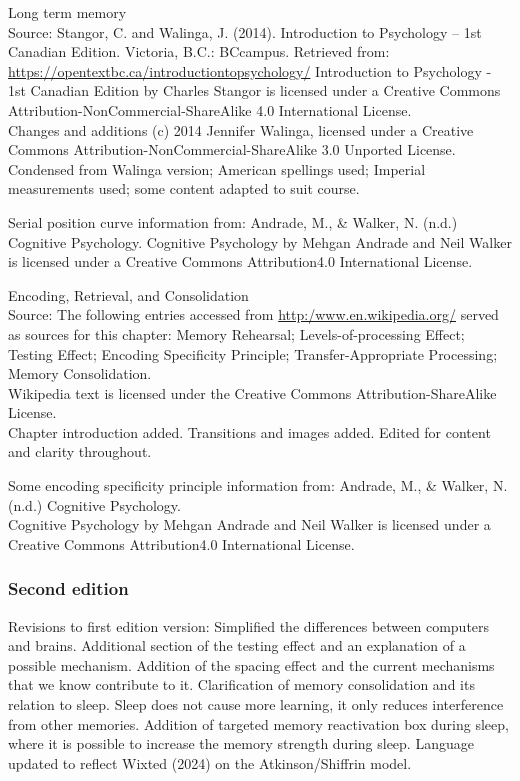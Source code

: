 \documentclass[
]{krantz}
\begin{document}
Long term memory\\
Source: Stangor, C. and Walinga, J. (2014). Introduction to Psychology -- 1st Canadian Edition. Victoria, B.C.: BCcampus. Retrieved from: \url{https://opentextbc.ca/introductiontopsychology/}
Introduction to Psychology - 1st Canadian Edition by Charles Stangor is licensed under a Creative Commons Attribution-NonCommercial-ShareAlike 4.0 International License.\\
Changes and additions (c) 2014 Jennifer Walinga, licensed under a Creative Commons Attribution-NonCommercial-ShareAlike 3.0 Unported License.\\
Condensed from Walinga version; American spellings used; Imperial measurements used; some content adapted to suit course.

Serial position curve information from: Andrade, M., \& Walker, N. (n.d.) Cognitive Psychology.
Cognitive Psychology by Mehgan Andrade and Neil Walker is licensed under a Creative Commons Attribution4.0 International License.

Encoding, Retrieval, and Consolidation\\
Source: The following entries accessed from \url{http:/www.en.wikipedia.org/} served as sources for this chapter: Memory Rehearsal; Levels-of-processing Effect; Testing Effect; Encoding Specificity Principle; Transfer-Appropriate Processing; Memory Consolidation.\\
Wikipedia text is licensed under the Creative Commons Attribution-ShareAlike License.\\
Chapter introduction added. Transitions and images added. Edited for content and clarity throughout.

Some encoding specificity principle information from: Andrade, M., \& Walker, N. (n.d.) Cognitive Psychology.\\
Cognitive Psychology by Mehgan Andrade and Neil Walker is licensed under a Creative Commons Attribution4.0 International License.\\

\subsubsection*{Second edition}\label{second-edition-5}


Revisions to first edition version: Simplified the differences between computers and brains. Additional section of the testing effect and an explanation of a possible mechanism. Addition of the spacing effect and the current mechanisms that we know contribute to it. Clarification of memory consolidation and its relation to sleep. Sleep does not cause more learning, it only reduces interference from other memories. Addition of targeted memory reactivation box during sleep, where it is possible to increase the memory strength during sleep. Language updated to reflect Wixted (2024) on the Atkinson/Shiffrin model.
\end{document}
